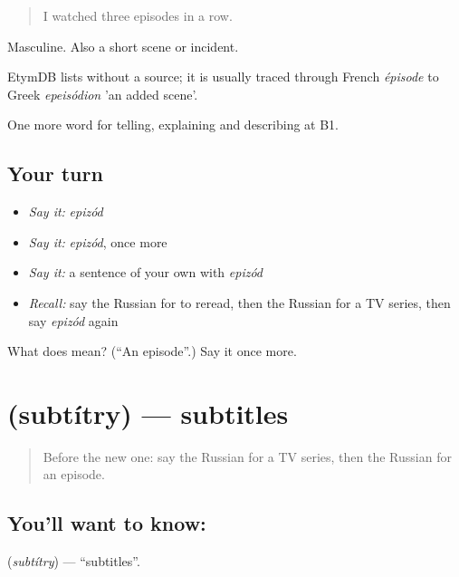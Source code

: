 \begin{quote}
I watched three episodes in a row.
\end{quote}

Masculine. Also a short scene or incident.

\begin{cousinweb}
EtymDB lists \emph{} without a source; it is usually traced through French \emph{épisode} to Greek \emph{epeisódion} 'an added scene'.
\end{cousinweb}

\begin{grammarlens}[title={What you've built}]
One more word for telling, explaining and describing at B1.
\end{grammarlens}

\subsection*{Your turn}
\begin{itemize}
\raggedright
  \item \emph{Say it:} \emph{epizód}
  \item \emph{Say it:} \emph{epizód}, once more
  \item \emph{Say it:} a sentence of your own with \emph{epizód}
  \item \emph{Recall:} say the Russian for to reread, then the Russian for a TV series, then say \emph{epizód} again
\end{itemize}

\begin{tcolorbox}[breakable,colback=teal!4,colframe=teal!35!black,title={Before you move on}]
What does  mean? (\textquotedblleft{}An episode\textquotedblright{}.) Say it once more.
\end{tcolorbox}
\section[\texorpdfstring{\ru{субтитры} (subtítry)}{субтитры (subtítry)}]{ (subtítry) — subtitles}

\label{lesson:RU-C527-subtitry}



\begin{quote}
Before the new one: say the Russian for a TV series, then the Russian for an episode.
\end{quote}

\subsection*{You'll want to know: }
\textbf{} (\emph{subtítry}) — \textquotedblleft{}subtitles\textquotedblright{}.


